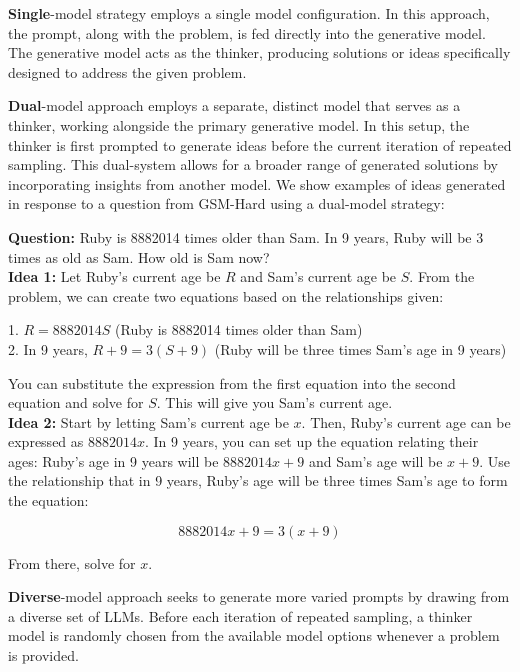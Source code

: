 \textbf{Single}-model strategy employs a single model configuration.  In this approach, the prompt, along with the problem, is fed directly into the generative model. The generative model acts as the thinker, producing solutions or ideas specifically designed to address the given problem.

\textbf{Dual}-model approach employs a separate, distinct model that serves as a thinker, working alongside the primary generative model. In this setup, the thinker is first prompted to generate ideas before the current iteration of repeated sampling. This dual-system allows for a broader range of generated solutions by incorporating insights from another model. We show examples of ideas generated in response to a question from GSM-Hard using a dual-model strategy:
\begin{tcolorbox}[title=Example Dual-model Ideas for a Math Question, colframe=low ]
\scriptsize{
\textbf{Question:} Ruby is 8882014 times older than Sam. In 9 years, Ruby will be 3 times as old as Sam. How old is Sam now? \\

  \textbf{Idea 1:} Let Ruby's current age be \( R \) and Sam's current age be \( S \). From the problem, we can create two equations based on the relationships given:

1. \( R = 8882014S \) (Ruby is 8882014 times older than Sam)\\
2. In 9 years, \( R + 9 = 3(S + 9) \) (Ruby will be three times Sam's age in 9 years)

You can substitute the expression from the first equation into the second equation and solve for \( S \). This will give you Sam's current age.\\


  \textbf{Idea 2:} Start by letting Sam's current age be \( x \). Then, Ruby's current age can be expressed as \( 8882014x \). In 9 years, you can set up the equation relating their ages: Ruby's age in 9 years will be \( 8882014x + 9 \) and Sam's age will be \( x + 9 \). Use the relationship that in 9 years, Ruby's age will be three times Sam's age to form the equation: 

\[ 8882014x + 9 = 3(x + 9) \]

From there, solve for \( x \).
  }
\end{tcolorbox}
\normalsize


\textbf{Diverse}-model approach  seeks to generate more varied prompts by drawing from a diverse set of LLMs. Before each iteration of repeated sampling, a thinker model is randomly chosen from the available model options whenever a problem is provided. %

